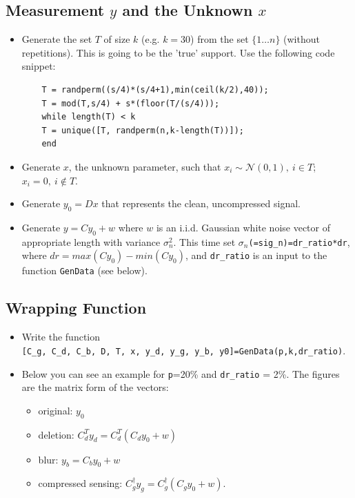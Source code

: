 \documentclass[]{article}
\newcommand{\code}{\item[\faKeyboardO]}
\begin{document}
\subsection{Measurement $y$ and the Unknown $x$ }  
\begin{itemize}
	\item Generate the set $T$ of size $k$ (e.g. $k=30$) from the set $\{1\ldots n\}$ (without repetitions). This is going to be the 'true' support. Use the following code snippet: 
	\begin{lstlisting}
	T = randperm((s/4)*(s/4+1),min(ceil(k/2),40)); 
	T = mod(T,s/4) + s*(floor(T/(s/4)));
	while length(T) < k 
	T = unique([T, randperm(n,k-length(T))]);
	end
	\end{lstlisting}
	\item Generate $x$, the unknown parameter, such that $x_i \sim \mathcal{N}(0,1),\ i\in T$; $x_i=0,\ i \notin T$.  
	\item Generate $y_0=Dx$ that represents the clean, uncompressed signal. 
	\item Generate $y = Cy_0+w$ where $w$ is an i.i.d. Gaussian white noise vector of appropriate length with variance $\sigma^2_n$. This time set $\sigma_n$\lstinline|(=sig_n)=dr_ratio*dr|,  where $dr = max(Cy_0) - min(Cy_0)$, and \lstinline|dr_ratio| is an input to the function \lstinline|GenData| (see below).  
\end{itemize}
\subsection {Wrapping Function} 
\begin{itemize} 
	\code Write the function \\
	\lstinline|[C_g, C_d, C_b, D, T, x, y_d, y_g, y_b, y0]=GenData(p,k,dr_ratio)|.    
	\item 	Below you can see an example for \lstinline|p|=20\% and \lstinline|dr_ratio| = 2\%. The figures are the matrix form of the vectors: 
	\begin{itemize}
		\item original: $y_0$  
		\item deletion: $C_d^Ty_d = C_d^T(C_dy_0+w)$ 
		\item blur: $y_b = C_by_0+w$ 
		\item compressed sensing: $C_g^\dagger y_g= C_g^\dagger (C_g y_0 + w) $. 
	\end{itemize}

\end{itemize}
\end{document}
